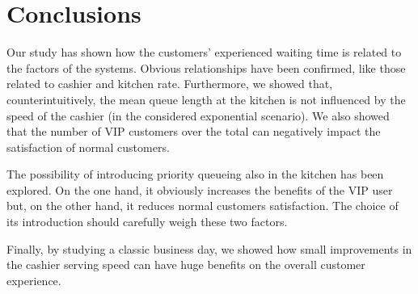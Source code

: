 \section{Conclusions}
Our study has shown how the customers' experienced waiting time is related to the factors of the systems. Obvious relationships have been confirmed, like those related to cashier and kitchen rate. 
Furthermore, we showed that, counterintuitively, the mean queue length at the kitchen is not influenced by the speed of the cashier (in the considered exponential scenario). 
We also showed that the number of VIP customers over the total can negatively impact the satisfaction of normal customers.

The possibility of introducing priority queueing also in the kitchen has been explored. On the one hand, it obviously increases the benefits of the VIP user but, on the other hand, it reduces normal customers satisfaction. The choice of its introduction should carefully weigh these two factors.

Finally, by studying a classic business day, we showed how small improvements in the cashier serving speed can have huge benefits on the overall customer experience.
